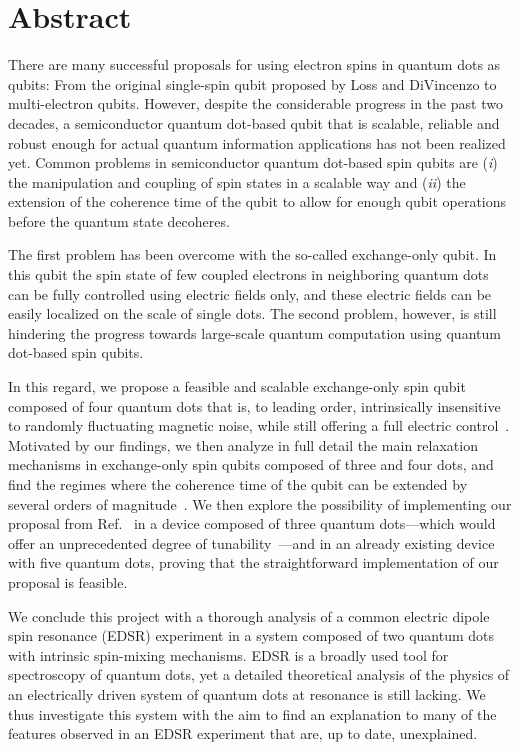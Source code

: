 
\chapter*{Abstract\label{sec:abs}}

\setcounter{page}{1}


There are many successful proposals for using electron spins in quantum dots as qubits: From the original single-spin qubit proposed by Loss and DiVincenzo to multi-electron qubits. However, despite the considerable progress in the past two decades, a semiconductor quantum dot-based qubit that is scalable, reliable and robust enough for actual quantum information applications has not been realized yet.
%
Common problems in semiconductor quantum dot-based spin qubits are (\textit{i}) the manipulation and coupling of spin states in a scalable way and (\textit{ii}) the extension of the coherence time of the qubit to allow for enough qubit operations before the quantum state decoheres.

The first problem has been overcome with the so-called exchange-only qubit. In this qubit the spin state of few coupled electrons in neighboring quantum dots can be fully controlled using electric fields only, and these electric fields can be easily localized on the scale of single dots. The second problem, however, is still hindering the progress towards large-scale quantum computation using quantum dot-based spin qubits.

%
In this regard, we propose a feasible and scalable exchange-only spin qubit composed of four quantum dots that is, to leading order, intrinsically insensitive to randomly fluctuating magnetic noise, while still offering a full electric control~\cite{Sala2017}.
%
Motivated by our findings, we then analyze in full detail the main relaxation mechanisms in exchange-only spin qubits composed of three and four dots, and find the regimes where the coherence time of the qubit can be extended by several orders of magnitude~\cite{Sala2018}.
%
We then explore the possibility of implementing our proposal from Ref.~\cite{Sala2017} in a device composed of three quantum dots---which would offer an unprecedented degree of tunability~\cite{Sala2020}---and in an already existing device with five quantum dots, proving that the straightforward implementation of our proposal is feasible.

We conclude this project with a thorough analysis of a common electric dipole spin resonance (EDSR) experiment in a system composed of two quantum dots with intrinsic spin-mixing mechanisms. EDSR is a broadly used tool for spectroscopy of quantum dots, yet a detailed theoretical analysis of the physics of an electrically driven system of quantum dots at resonance is still lacking. We thus investigate this system with the aim to find an explanation to many of the features observed in an EDSR experiment that are, up to date, unexplained.






